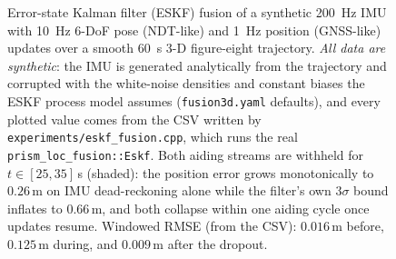 \begin{figure}[t]
  \caption{Error-state Kalman filter (ESKF) fusion of a synthetic 200~Hz IMU
    with 10~Hz 6-DoF pose (NDT-like) and 1~Hz position (GNSS-like) updates over a
    smooth 60~s 3-D figure-eight trajectory. \emph{All data are synthetic}: the
    IMU is generated analytically from the trajectory and corrupted with the
    white-noise densities and constant biases the ESKF process model assumes
    (\texttt{fusion3d.yaml} defaults), and every plotted value comes from the CSV
    written by \texttt{experiments/eskf\_fusion.cpp}, which runs the real
    \texttt{prism\_loc\_fusion::Eskf}. Both aiding streams are withheld for
    $t\in[25,35]\,$s (shaded): the position error grows monotonically to
    $0.26\,$m on IMU dead-reckoning alone while the filter's own $3\sigma$ bound
    inflates to $0.66\,$m, and both collapse within one aiding cycle once
    updates resume. Windowed RMSE (from the CSV): $0.016\,$m before, $0.125\,$m
    during, and $0.009\,$m after the dropout.}
  \label{fig:eskf}
\end{figure}
